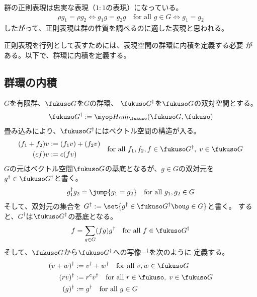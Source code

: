 	群の正則表現は忠実な表現（$1:1$の表現）になっている。
	\begin{equation*}\begin{split}
		\rho g_1 = \rho g_2
		\iff g_1g = g_2g \quad\text{for all }g\in G
		\iff g_1 = g_2
	\end{split}\end{equation*}
	したがって、正則表現は群の性質を調べるのに適した表現と思われる。

	正則表現を行列として表すためには、表現空間の群環に内積を定義する必要
	がある。以下で、群環に内積を定義する。

\subsection{群環の内積}\label{s2:群環の内積} %
	$G$を有限群、$\fukuso G$を$G$の群環、
	$\fukuso G^\dag$を$\fukuso G$の双対空間とする。
	\begin{equation*}\begin{split}
		\fukuso G^\dag:=\Hom_\fukuso(\fukuso G,\fukuso)
	\end{split}\end{equation*}
	畳み込みにより、$\fukuso G^\dag$にはベクトル空間の構造が入る。
	\begin{equation*}\begin{split}
		(f_1+f_2)v &:= (f_1v) + (f_2v) \\
		(cf)v &:= c(fv)
	\end{split}
		\quad\text{for all }f_1,f_2,f\in\fukuso G^\dag,\;v\in \fukuso G
	\end{equation*}
	$G$の元はベクトル空間$\fukuso G$の基底となるが、$g\in G$の双対元を
	$g^\dag\in\fukuso G^\dag$と書く。
	\begin{equation*}\begin{split}
		g_1^\dag g_2 = \jump{g_1=g_2} \quad\text{for all }g_1,g_2\in G
	\end{split}\end{equation*}
	そして、双対元の集合を
	$G^\dag:=\set{g^\dag\in\fukuso G^\dag\bou g\in G}$と書く。
	すると、$G^\dag$は$\fukuso G^\dag$の基底となる。
	\begin{equation*}\begin{split}
		f = \sum_{g\in G}(fg)g^\dag \quad\text{for all }f\in \fukuso G^\dag
	\end{split}\end{equation*}
	そして、$\fukuso G$から$\fukuso G^\dag$への写像$-^\dag$を次のように
	定義する。
	\begin{equation*}\begin{split}
		(v+w)^\dag &:= v^\dag + w^\dag \quad\text{for all }v,w\in \fukuso G \\
		(rv)^\dag &:= r^cv^\dag
			\quad\text{for all }r\in\fukuso,\;v\in \fukuso G \\
		(g)^\dag &:= g^\dag \quad\text{for all }g\in G \\
	\end{split}\end{equation*}
